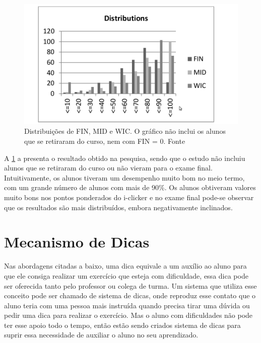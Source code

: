 \begin{figure}[]
	\centering
	\captionsetup{justification=centering}
	\includegraphics[width=.8\linewidth]{referencialteorico/cukierman.png}
	\caption{Distribuições de FIN, MID e WIC. O gráfico não inclui os alunos que se retiraram do curso, nem com FIN = 0. Fonte \cite{Cukierman:2015:PSU:2729094.2742623}}
	\label{figura:resultadoCukierman}
\end{figure}

A \cref{figura:resultadoCukierman} a presenta o resultado obtido na pesquisa, sendo que o estudo não incluiu alunos que se retiraram do curso ou não vieram para o exame final. Intuitivamente, os alunos tiveram um desempenho muito bom no meio termo, com um grande número de alunos com mais de 90\%. Os alunos obtiveram valores muito bons nos pontos ponderados do i-clicker e no exame final pode-se observar que os resultados são mais distribuídos, embora negativamente inclinados.


\section{Mecanismo de Dicas}

Nas abordagens citadas a baixo, uma dica equivale a um auxílio ao aluno para que ele consiga realizar um exercício que esteja com dificuldade, essa dica pode ser oferecida tanto pelo professor ou colega de turma. Um sistema que utiliza esse conceito pode ser chamado de sistema de dicas, onde reproduz esse contato que o aluno teria com uma pessoa mais instruída quando precisa tirar uma dúvida ou pedir uma dica para realizar o exercício. Mas o aluno com dificuldades não pode ter esse apoio todo o tempo, então estão sendo criados sistema de dicas para suprir essa necessidade de auxiliar o aluno no seu aprendizado.

